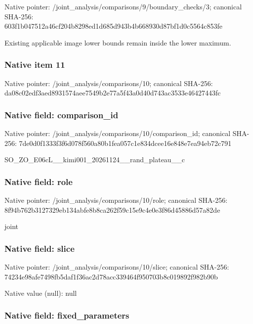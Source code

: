 \documentclass[10pt,a4paper]{article}
\begin{document}
Native pointer: /joint\_analysis/comparis\allowbreak{}ons/9/boundary\_checks/3; canonical SHA-256: 603f1b047512a46cf204b829\allowbreak{}8ed1d685d943b4b668930d87\allowbreak{}bf1d0c5564c853fe


Existing applicable image lower bounds remain inside the lower maximum.


\subsubsection{Native item 11}


Native pointer: /joint\_analysis/comparisons/10; canonical SHA-256: da08c02edf3aed8931574aee\allowbreak{}7549b2e77a5f43a0d40d743a\allowbreak{}c3533e46427443fc



\subsubsection{Native field: comparison\_id}


Native pointer: /joint\_analysis/comparis\allowbreak{}ons/10/comparison\_id; canonical SHA-256: 7de0d0f1333f3f6d078f560a\allowbreak{}80b1fea057c1e834dcee16e8\allowbreak{}48e7ea94eb72c791


SO\_ZO\_E06cL\_\_kimi001\_202\allowbreak{}61124\_\_rand\_plateau\_\_c


\subsubsection{Native field: role}


Native pointer: /joint\_analysis/comparisons/10/role; canonical SHA-256: 8f94b762b3127329eb134abf\allowbreak{}e8b8ca262f59c15e9c4e0e3f\allowbreak{}86d45886d57a82de


joint


\subsubsection{Native field: slice}


Native pointer: /joint\_analysis/comparisons/10/slice; canonical SHA-256: 74234e98afe7498fb5daf1f3\allowbreak{}6ac2d78acc339464f950703b\allowbreak{}8c019892f982b90b



Native value (null): null



\subsubsection{Native field: fixed\_parameters}
\end{document}
